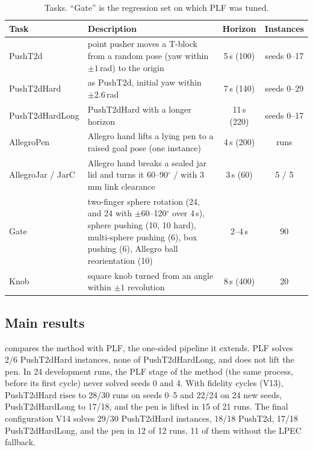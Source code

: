 \documentclass[11pt]{article}
\theoremstyle{remark}
\begin{document}
\begin{table}[t]
\centering
\caption{Tasks. ``Gate'' is the regression set on which PLF was tuned.}
\label{tab:tasks}
\small
\begin{tabularx}{\linewidth}{@{}lXcc@{}}
\toprule
Task & Description & Horizon & Instances \\
\midrule
PushT2d & point pusher moves a T-block from a random pose (yaw within $\pm1$\,rad) to the origin & 5\,s (100) & seeds 0--17 \\
PushT2dHard & as PushT2d, initial yaw within $\pm2.6$\,rad & 7\,s (140) & seeds 0--29 \\
PushT2dHardLong & PushT2dHard with a longer horizon & 11\,s (220) & seeds 0--17 \\
AllegroPen & Allegro hand lifts a lying pen to a raised goal pose (one instance) & 4\,s (200) & runs \\
AllegroJar / JarC & Allegro hand breaks a sealed jar lid and turns it 60--90$^\circ$ / with 3\,mm link clearance & 3\,s (60) & 5 / 5 \\
Gate & two-finger sphere rotation (24, and 24 with $\pm$60--120$^\circ$ over 4\,s), sphere pushing (10, 10 hard), multi-sphere pushing (6), box pushing (6), Allegro ball reorientation (10) & 2--4\,s & 90 \\
Knob & square knob turned from an angle within $\pm1$ revolution & 8\,s (400) & 20 \\
\bottomrule
\end{tabularx}
\end{table}

\subsection{Main results}

 compares the method with PLF, the one-sided pipeline it extends. PLF solves 2/6 PushT2dHard instances, none of PushT2dHardLong, and does not lift the pen. In 24 development runs, the PLF stage of the method (the same process, before its first cycle) never solved seeds 0 and 4. With fidelity cycles (V13), PushT2dHard rises to 28/30 runs on seeds 0--5 and 22/24 on 24 new seeds, PushT2dHardLong to 17/18, and the pen is lifted in 15 of 21 runs. The final configuration V14 solves 29/30 PushT2dHard instances, 18/18 PushT2d, 17/18 PushT2dHardLong, and the pen in 12 of 12 runs, 11 of them without the LPEC fallback.
\end{document}
